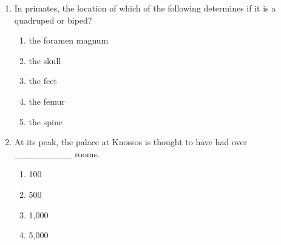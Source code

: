 \documentclass[12pt]{article}
\begin{document}
\begin{enumerate}[label=\arabic*.]
\begin{enumerate}[label=(\alph*)]
    \item primarily C 4 plants that included corn and potatoes.
\end{enumerate}
\item In primates, the location of which of the following determines if it is a quadruped or biped?
\begin{enumerate}[label=(\alph*)]
    \item the foramen magnum
    \item the skull
    \item the feet
    \item the femur
    \item the spine
\end{enumerate}
\item At its peak, the palace at Knossos is thought to have had over \_\_\_\_\_\_\_\_\_ rooms.
\begin{enumerate}[label=(\alph*)]
    \item 100
    \item 500
    \item 1,000
    \item 5,000
\end{enumerate}
\end{enumerate}
\end{document}
